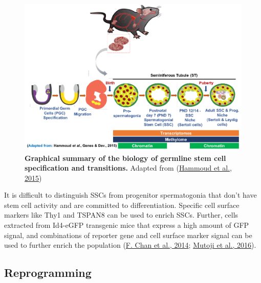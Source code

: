 \documentclass[12pt,twoside]{reedthesis}
\begin{document}
\begin{figure}[htbp]

{\centering \includegraphics{thesis_files/figure-latex/if2-1} 

}

\caption[Graphical summary of the biology of germline stem cell specification and transitions]{\textbf{Graphical summary of the biology of germline stem cell specification and transitions.} Adapted from (\protect\hyperlink{ref-hammoud2015}{Hammoud et al., 2015})}\label{fig:if2}
\end{figure}
It is difficult to distinguish SSCs from progenitor spermatogonia that
don't have stem cell activity and are committed to
differentiation. Specific cell surface markers like Thy1 and TSPAN8 can
be used to enrich SSCs. Further, cells extracted from Id4-eGFP
transgenic mice that express a high amount of GFP signal, and
combinations of reporter gene and cell surface marker signal can be used
to further enrich the population (\protect\hyperlink{ref-chan2014}{F. Chan et al., 2014}; \protect\hyperlink{ref-mutoji2016}{Mutoji et al., 2016}).

\hypertarget{reprogramming}{%
\subsection*{Reprogramming}\label{reprogramming}}
\end{document}
